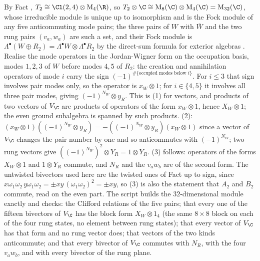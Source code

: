 By Fact , $T_{2} \cong \Cl(2,4) \otimes \mathrm{M}_{4}(\R)$, so $T_{2} \otimes \C \cong \mathrm{M}_{8}(\C) \otimes \mathrm{M}_{4}(\C) = \mathrm{M}_{32}(\C)$, whose irreducible module is unique up to isomorphism and is the Fock module of any five anticommuting mode pairs; the three pairs of $W$ with $\overline{W}$ and the two rung pairs $(v_{a}, w_{a})$ are such a set, and their Fock module is $\Lambda^{\bullet}(W \oplus R_{2}) = \Lambda^{\bullet}W \otimes \Lambda^{\bullet}R_{2}$ by the direct-sum formula for exterior algebras \cite[App.~B.2]{FultonHarris1991}. Realise the mode operators in the Jordan-Wigner form on the occupation basis, modes $1, 2, 3$ of $W$ before modes $4, 5$ of $R_{2}$: the creation and annihilation operators of mode $i$ carry the sign $(-1)^{\#\{\text{occupied modes below } i\}}$. For $i \le 3$ that sign involves pair modes only, so the operator is $x_{W} \otimes 1$; for $i \in \{4, 5\}$ it involves all three pair modes, giving $(-1)^{N_{W}} \otimes y_{R}$. This is (1) for vectors, and products of two vectors of $V_{\C}$ are products of operators of the form $x_{W} \otimes 1$, hence $X_{W} \otimes 1$; the even ground subalgebra is spanned by such products. (2): $(x_{W} \otimes 1)((-1)^{N_{W}} \otimes y_{R}) = -((-1)^{N_{W}} \otimes y_{R})(x_{W} \otimes 1)$ since a vector of $V_{\C}$ changes the pair number by one and so anticommutes with $(-1)^{N_{W}}$; two rung vectors give $((-1)^{N_{W}})^{2} \otimes Y_{R} = 1 \otimes Y_{R}$. (3) follows: operators of the forms $X_{W} \otimes 1$ and $1 \otimes Y_{R}$ commute, and $N_{R}$ and the $v_{a}w_{b}$ are of the second form. The untwisted bivectors used here are the twisted ones of Fact  up to sign, since $x\omega_{1}\omega_{2}\,y\omega_{1}\omega_{2} = \pm xy\,(\omega_{1}\omega_{2})^{2} = \pm xy$, so (3) is also the statement that $A_{2}$ and $B_{2}$ commute, read on the even part. The script builds the $32$-dimensional module exactly and checks: the Clifford relations of the five pairs; that every one of the fifteen bivectors of $V_{\C}$ has the block form $X_{W} \otimes 1_{4}$ (the same $8 \times 8$ block on each of the four rung states, no element between rung states); that every vector of $V_{\C}$ has that form and no rung vector does; that vectors of the two kinds anticommute; and that every bivector of $V_{\C}$ commutes with $N_{R}$, with the four $v_{a}w_{b}$, and with every bivector of the rung plane.
